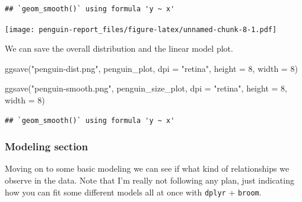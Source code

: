 \documentclass[
]{article}
\newenvironment{Shaded}{\begin{snugshade}}{\end{snugshade}}
\newcommand{\AttributeTok}[1]{\textcolor[rgb]{0.77,0.63,0.00}{#1}}
\newcommand{\DecValTok}[1]{\textcolor[rgb]{0.00,0.00,0.81}{#1}}
\newcommand{\FunctionTok}[1]{\textcolor[rgb]{0.00,0.00,0.00}{#1}}
\newcommand{\NormalTok}[1]{#1}
\newcommand{\StringTok}[1]{\textcolor[rgb]{0.31,0.60,0.02}{#1}}
\begin{document}
\begin{verbatim}
## `geom_smooth()` using formula 'y ~ x'
\end{verbatim}

\texttt{[image: penguin-report\_files/figure-latex/unnamed-chunk-8-1.pdf]}

We can save the overall distribution and the linear model plot.

\begin{Shaded}
\begin{Highlighting}[]
\FunctionTok{ggsave}\NormalTok{(}\StringTok{"penguin{-}dist.png"}\NormalTok{, penguin\_plot, }
  \AttributeTok{dpi =} \StringTok{"retina"}\NormalTok{, }\AttributeTok{height =} \DecValTok{8}\NormalTok{, }\AttributeTok{width =} \DecValTok{8}\NormalTok{)}

\FunctionTok{ggsave}\NormalTok{(}\StringTok{"penguin{-}smooth.png"}\NormalTok{, penguin\_size\_plot, }
  \AttributeTok{dpi =} \StringTok{"retina"}\NormalTok{, }\AttributeTok{height =} \DecValTok{8}\NormalTok{, }\AttributeTok{width =} \DecValTok{8}\NormalTok{)}
\end{Highlighting}
\end{Shaded}

\begin{verbatim}
## `geom_smooth()` using formula 'y ~ x'
\end{verbatim}

\hypertarget{modeling-section}{%
\subsubsection{Modeling section}\label{modeling-section}}

Moving on to some basic modeling we can see if what kind of
relationships we observe in the data. Note that I'm really not following
any plan, just indicating how you can fit some different models all at
once with \texttt{dplyr} + \texttt{broom}.
\end{document}
